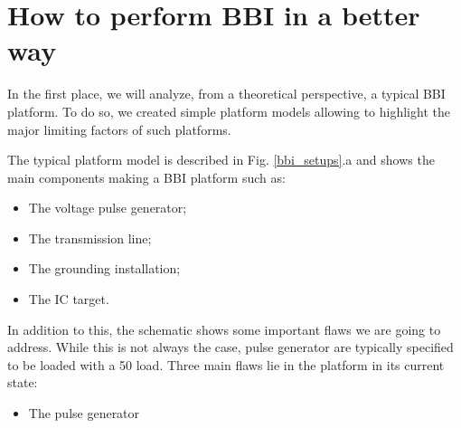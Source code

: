 
\section{How to perform BBI in a better way}
	In the first place, we will analyze, from a theoretical perspective, a typical BBI platform.
	To do so, we created simple platform models allowing to highlight the major limiting factors of such platforms.
	
	The typical platform model is described in Fig. \ref{bbi_setups}.a and shows the main components making a BBI platform such as:
	\begin{itemize}
		\item The voltage pulse generator;
		\item The transmission line;
		\item The grounding installation;
		\item The IC target.
	\end{itemize}
	In addition to this, the schematic shows some important flaws we are going to address.
	While this is not always the case, pulse generator are typically specified to be loaded with a 50 \textomega load.
	Three main flaws lie in the platform in its current state:
	\begin{itemize}
		\item The pulse generator
	\end{itemize}
